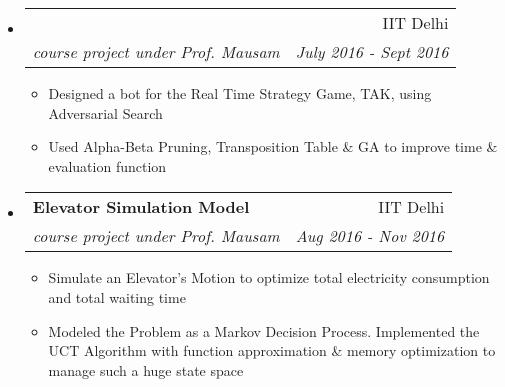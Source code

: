 \documentclass[letterpaper,11pt]{article}
\makeatletter
\newcommand{\MYhref}[3][blue]{\href{#2}{\color{#1}{#3}}}%
\newcommand{\ressubheading}[4]{
\begin{tabular*}{6.5in}{l@{\extracolsep{\fill}}r}
    \textbf{#1} & #2 \\
    \textit{#3} & \textit{#4} \\
\end{tabular*}\vspace{-6pt}}
\makeatother
\begin{document}
\begin{itemize}
\item
\ressubheading{\MYhref[black]{https://github.com/RohitNaikJ/TAK-Game-Player}{Artificial Game Player for TAK}}{IIT Delhi}{course project under Prof. Mausam}{July 2016 - Sept 2016}
\begin{itemize}
\item Designed a bot for the Real Time Strategy Game, TAK, using Adversarial Search
\item Used Alpha-Beta Pruning, Transposition Table \& GA to improve time \& evaluation function
\end{itemize}

\item
\ressubheading{Elevator Simulation Model}{IIT Delhi}{course project under Prof. Mausam}{Aug 2016 - Nov 2016}
\begin{itemize}
\item Simulate an Elevator's Motion to optimize total electricity consumption and total waiting time
\item Modeled the Problem as a Markov Decision Process. Implemented the UCT Algorithm with function approximation \& memory optimization to manage such a huge state space
\end{itemize}





\end{itemize}
\end{document}
